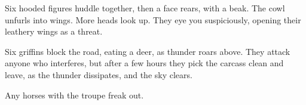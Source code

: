 \begin{boxtext}
  Six hooded figures huddle together, then a face rears, with a beak.
  The cowl unfurls into wings.
  More heads look up.
  They eye you suspiciously, opening their leathery wings as a threat.
\end{boxtext}

Six \glspl{griffin} block the road, eating a deer, as thunder roars above.
They attack anyone who interferes, but after a few hours they pick the carcass clean and leave, as the thunder dissipates, and the sky clears.

Any horses with the troupe freak out.

